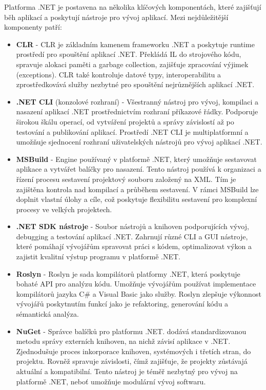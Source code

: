 
Platforma .NET je postavena na několika klíčových komponentách, které zajišťují běh aplikací a poskytují nástroje pro vývoj aplikací. Mezi nejdůležitější komponenty patří:


\begin{itemize}
    \item \textbf{CLR} - CLR je základním kamenem frameworku .NET a poskytuje runtime prostředí pro spouštění aplikací .NET. Překládá IL do strojového kódu, spravuje alokaci paměti a garbage collection, zajišťuje zpracování výjimek (exceptions). CLR také kontroluje datové typy, interoperabilitu a zprostředkovává služby nezbytné pro spouštění nejrůznějších aplikací .NET.
    \item \textbf{.NET CLI} (konzolové rozhraní) - Všestranný nástroj pro vývoj, kompilaci a nasazení aplikací .NET prostřednictvím rozhraní příkazové řádky. Podporuje širokou škálu operací, od vytváření projektů a správy závislostí až po testování a publikování aplikací. Prostředí .NET CLI je multiplatformní a umožňuje sjednocení rozhraní uživatelských nástrojů pro vývoj aplikací .NET.
    \item \textbf{MSBuild} - Engine používaný v platformě .NET, který umožňuje sestavovat aplikace a vytvářet balíčky pro nasazení. Tento nástroj používá k organizaci a řízení procesu sestavení projektový souboru založený na XML. Tím je zajištěna kontrola nad kompilací a průběhem sestavení. V rámci MSBuild lze doplnit vlastní úlohy a cíle, což poskytuje flexibilitu sestavení pro komplexní procesy ve velkých projektech.
    \item \textbf{.NET SDK nástroje} - Soubor nástrojů a knihoven podporujících vývoj, debugging a testování aplikací .NET. Zahrnují různé CLI a GUI nástroje, které pomáhají vývojářům spravovat práci s kódem, optimalizovat výkon a zajistit kvalitní výstup programu v platformě .NET.
    \item \textbf{Roslyn} - Roslyn je sada kompilátorů platformy .NET, která poskytuje bohaté API pro analýzu kódu. Umožňuje vývojářům používat implementace kompilátorů jazyka C\# a Visual Basic jako služby. Roslyn zlepšuje výkonnost vývojářů poskytnutím funkcí jako je refaktoring, generování kódu a sémantická analýza.
    \item \textbf{NuGet} - Správce balíčků pro platformu .NET. dodává standardizovanou metodu správy externích knihoven, na nichž závisí aplikace v .NET. Zjednodušuje proces inkorporace knihoven, systémových i třetích stran, do projektu. Rovněž spravuje závislosti, čímž zajišťuje, že projekty zůstávajá aktuální a kompatibilní. Tento nástroj je téměř nezbytný pro vývoj na platformě .NET, neboť umožňuje modulární vývoj softwaru.
\end{itemize}

